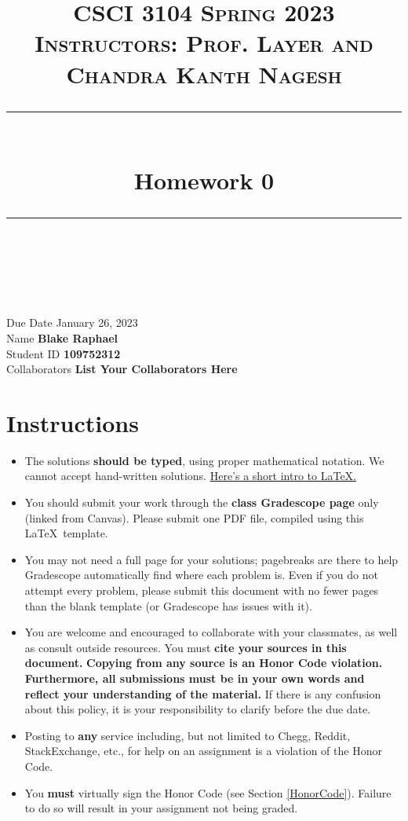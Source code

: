 \documentclass[11pt]{article}
\title{
\normalfont \normalsize 
\textsc{CSCI 3104 Spring 2023 \\ 
Instructors: Prof. Layer and Chandra Kanth Nagesh} \\
[10pt] 
\rule{\linewidth}{0.5pt} \\[6pt] 
\huge Homework 0 \\
\rule{\linewidth}{2pt}  \\[10pt]
}
\date{}
\theoremstyle{definition}
\theoremstyle{definition}
\theoremstyle{definition}
\begin{document}
\maketitle


\noindent
Due Date \dotfill January 26, 2023 \\
Name \dotfill \textbf{Blake Raphael} \\
Student ID \dotfill \textbf{109752312} \\
Collaborators \dotfill \textbf{List Your Collaborators Here}

\tableofcontents

\section{Instructions}
 \begin{itemize}
	\item The solutions \textbf{should be typed}, using proper mathematical notation. We cannot accept hand-written solutions. \href{http://ece.uprm.edu/~caceros/latex/introduction.pdf}{Here's a short intro to \LaTeX.}
	\item You should submit your work through the \textbf{class Gradescope page} only (linked from Canvas). Please submit one PDF file, compiled using this \LaTeX \ template.
	\item You may not need a full page for your solutions; pagebreaks are there to help Gradescope automatically find where each problem is. Even if you do not attempt every problem, please submit this document with no fewer pages than the blank template (or Gradescope has issues with it).

	\item You are welcome and encouraged to collaborate with your classmates, as well as consult outside resources. You must \textbf{cite your sources in this document.} \textbf{Copying from any source is an Honor Code violation. Furthermore, all submissions must be in your own words and reflect your understanding of the material.} If there is any confusion about this policy, it is your responsibility to clarify before the due date. 

	\item Posting to \textbf{any} service including, but not limited to Chegg, Reddit, StackExchange, etc., for help on an assignment is a violation of the Honor Code.

	\item You \textbf{must} virtually sign the Honor Code (see Section \ref{HonorCode}). Failure to do so will result in your assignment not being graded.
\end{itemize}
\end{document}

